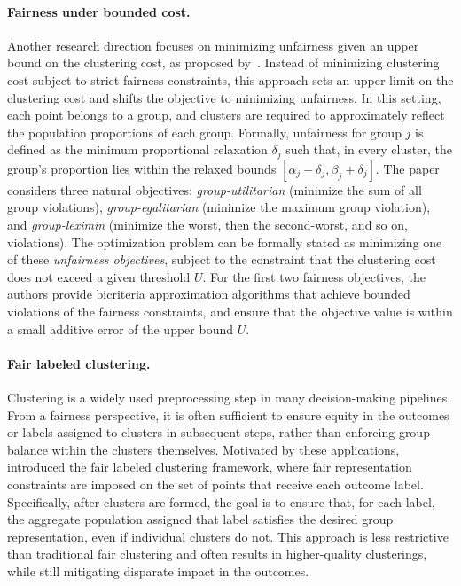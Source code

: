 \paragraph{Fairness under bounded cost.}
Another research direction focuses on minimizing unfairness given an upper bound on the clustering cost, as proposed by~\citet{DBLP:conf/nips/EsmaeiliBSD21}. Instead of minimizing clustering cost subject to strict fairness constraints, this approach sets an upper limit on the clustering cost and shifts the objective to minimizing unfairness. In this setting, each point belongs to a group, and clusters are required to approximately reflect the population proportions of each group. Formally, unfairness for group $j$ is defined as the minimum proportional relaxation $\delta_j$ such that, in every cluster, the group's proportion lies within the relaxed bounds $[\alpha_j - \delta_j, \beta_j + \delta_j]$. The paper considers three natural objectives: \emph{group-utilitarian} (minimize the sum of all group violations), \emph{group-egalitarian} (minimize the maximum group violation), and \emph{group-leximin} (minimize the worst, then the second-worst, and so on, violations). The optimization problem can be formally stated as minimizing one of these \emph{unfairness objectives}, subject to the constraint that the clustering cost does not exceed a given threshold $U$. For the first two fairness objectives, the authors provide bicriteria approximation algorithms that achieve bounded violations of the fairness constraints, and ensure that the objective value is within a small additive error of the upper bound $U$. 

\paragraph{Fair labeled clustering.} Clustering is a widely used preprocessing step in many decision-making pipelines. From a fairness perspective, it is often sufficient to ensure equity in the outcomes or labels assigned to clusters in subsequent steps, rather than enforcing group balance within the clusters themselves. Motivated by these applications, \citet{esmaeili2022fair} introduced the fair labeled clustering framework, where fair representation constraints are imposed on the set of points that receive each outcome label. Specifically, after clusters are formed, the goal is to ensure that, for each label, the aggregate population assigned that label satisfies the desired group representation, even if individual clusters do not. This approach is less restrictive than traditional fair clustering and often results in higher-quality clusterings, while still mitigating disparate impact in the outcomes.

